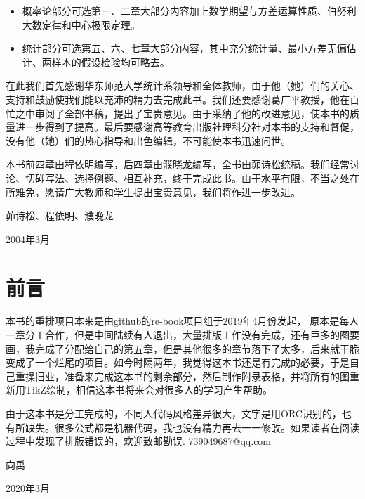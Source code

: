 \begin{itemize}
  \item 概率论部分可选第一、二章大部分内容加上数学期望与方差运算性质、伯努利大数定律和中心极限定理。
  \item 统计部分可选第五、六、七章大部分内容，其中充分统计量、最小方差无偏估计、两样本的假设检验均可略去。
\end{itemize}

在此我们首先感谢华东师范大学统计系领导和全体教师，由于他（她）们的关心、支持和鼓励使我们能以充沛的精力去完成此书。我们还要感谢葛广平教授，他在百忙之中审阅了全部书稿，提出了宝贵意见。由于采纳了他的改进意见，使本书的质量进一步得到了提高。最后要感谢高等教育出版社理科分社对本书的支持和督促，没有他（她）们的热心指导和出色编辑，不可能使本书迅速问世。

本书前四章由程依明编写，后四章由濮晓龙编写，全书由茆诗松统稿。我们经常讨论、切碰写法、选择例题、相互补充，终于完成此书。由于水平有限，不当之处在所难免，愿请广大教师和学生提出宝贵意见，我们将作进一步改进。

\hfill 茆诗松、程依明、濮晚龙

\hfill 2004年3月 \hspace{0.8cm}

\chapter*{前言}
本书的重排项目本来是由github的re-book项目组于2019年4月份发起， 原本是每人一章分工合作，但是中间陆续有人退出，大量排版工作没有完成，还有巨多的图要画，我完成了分配给自己的第五章，但是其他很多的章节落下了太多，后来就干脆变成了一个烂尾的项目。如今时隔两年，我觉得这本书还是有完成的必要，于是自己重操旧业，准备来完成这本书的剩余部分，然后制作附录表格，并将所有的图重新用TikZ绘制，相信这本书将来会对很多人的学习产生帮助。

由于这本书是分工完成的，不同人代码风格差异很大，文字是用ORC识别的，也有所缺失。很多公式都是机器代码，我也没有精力再去一一修改。如果读者在阅读过程中发现了排版错误的，欢迎致邮勘误. \href{739049687@qq.com}{739049687@qq.com}

\hfill 向禹\hspace{2em}

\hfill 2020年3月
